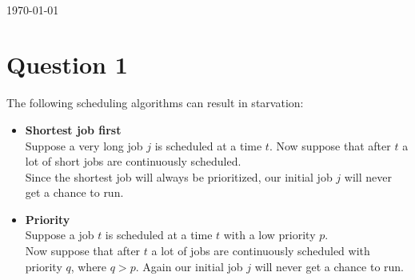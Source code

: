 \documentclass[12pt]{article}
\begin{document}
\begin{titlepage}
\begin{minipage}{0.4\textwidth}
\begin{flushright}
\end{flushright}
\end{minipage}\\[3cm]



{\large \today}\\[3cm] %


 

\vfill %

\end{titlepage}

\section*{Question 1}
The following scheduling algorithms can result in starvation:
\begin{itemize}
\item \textbf{Shortest job first} \\
      Suppose a very long job $j$ is scheduled at a time $t$.
      Now suppose that after $t$ a lot of short jobs are continuously scheduled. \\
      Since the shortest job will always be prioritized, our initial job $j$ will never get a chance to run.
\item \textbf{Priority} \\
      Suppose a job $t$ is scheduled at a time $t$ with a low priority $p$. \\
      Now suppose that after $t$ a lot of jobs are continuously scheduled with priority $q$, where  $q > p$.
      Again our initial job $j$ will never get a chance to run.
\end{itemize}
\end{document}
